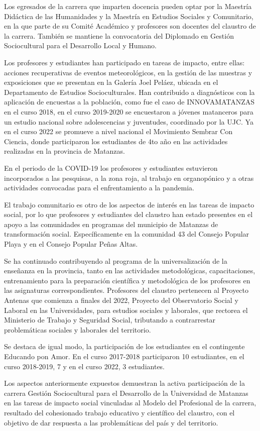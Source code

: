 Los egresados de la carrera que imparten docencia pueden optar por la Maestría Didáctica de las Humanidades y la Maestría en Estudios Sociales y Comunitario, en la que parte de su Comité Académico y profesores son docentes del claustro de la carrera. También se mantiene la convocatoria del Diplomado en Gestión Sociocultural para el Desarrollo Local y Humano.

Los profesores y estudiantes han participado en tareas de impacto, entre ellas: acciones recuperativas de eventos meteorológicos, en la gestión de las muestras y exposiciones que se presentan en la Galería Joel Peláez, ubicada en el Departamento de Estudios Socioculturales. Han contribuido a diagnósticos con la aplicación de encuestas a la población, como fue el caso de INNOVAMATANZAS en el curso 2018, en el curso 2019-2020 se encuestaron a jóvenes matanceros para un estudio nacional sobre adolescencias y juventudes, coordinado por la UJC. Ya en el curso 2022 se promueve a nivel nacional el Movimiento Sembrar Con Ciencia, donde participaron los estudiantes de 4to año en las actividades realizadas en la provincia de Matanzas. 

En el periodo de la COVID-19 los profesores y estudiantes estuvieron incorporados a las pesquisas, a la zona roja, al trabajo en organopónico y a otras actividades convocadas para el enfrentamiento a la pandemia.

El trabajo comunitario es otro de los aspectos de interés en las tareas de impacto social, por lo que profesores y estudiantes del claustro han estado presentes en el apoyo a las comunidades en programas del municipio de Matanzas de transformación social. Específicamente en la comunidad 43 del Consejo Popular Playa y en el Consejo Popular Peñas Altas. 

Se ha continuado contribuyendo al programa de la universalización de la enseñanza en la provincia, tanto en las actividades metodológicas, capacitaciones, entrenamiento para la preparación científica y metodológica de los profesores en las asignaturas correspondientes.
Profesores del claustro pertenecen al Proyecto Antenas que comienza a finales del 2022, Proyecto del Observatorio Social y Laboral en las Universidades, para estudios sociales y laborales, que rectorea el Ministerio de Trabajo y Seguridad Social, tributando a contrarrestar problemáticas sociales y laborales del territorio.

Se destaca de igual modo, la participación de los estudiantes en el contingente Educando pon Amor. En el curso 2017-2018 participaron 10 estudiantes, en el curso 2018-2019, 7 y en el curso 2022, 3 estudiantes.

Los aspectos anteriormente expuestos demuestran la activa participación de la carrera Gestión Sociocultural para el Desarrollo de la Universidad de Matanzas en las tareas de impacto social vinculadas al Modelo del Profesional de la carrera, resultado del cohesionado trabajo educativo y científico del claustro, con el objetivo de dar respuesta a las problemáticas del país y del territorio.